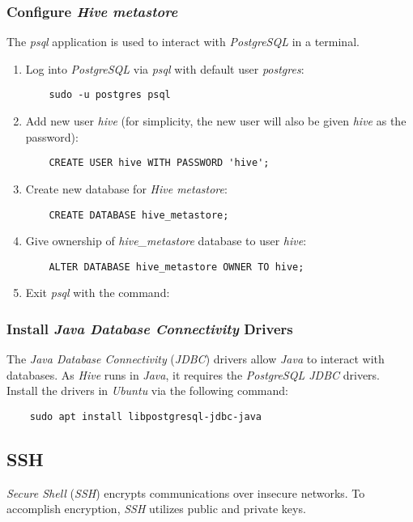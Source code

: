 \documentclass{article}
\begin{document}
    \subsubsection{Configure \emph{Hive metastore}}
    The \emph{psql} application is used to interact with \emph{PostgreSQL} in a terminal.
    \begin{enumerate}
    \item Log into \emph{PostgreSQL} via \emph{psql} with default user \emph{postgres}:
    \begin{verbatim}
    sudo -u postgres psql 
    \end{verbatim}

    \item Add new user \emph{hive}
    (for simplicity, the new user will also be given \emph{hive} as the password):
    \begin{verbatim}
    CREATE USER hive WITH PASSWORD 'hive';
    \end{verbatim}

    \item Create new database for \emph{Hive metastore}:
    \begin{verbatim}
    CREATE DATABASE hive_metastore;
    \end{verbatim}

    \item Give ownership of \emph{hive\_metastore} database to user \emph{hive}:
    \begin{verbatim}
    ALTER DATABASE hive_metastore OWNER TO hive;
    \end{verbatim}

    \item Exit \emph{psql} with the command: \texttt{\q}
    \end{enumerate}

    \subsubsection{Install \emph{Java Database Connectivity} Drivers}
    The \emph{Java Database Connectivity} (\emph{JDBC}) drivers allow \emph{Java} to interact with
    databases. As \emph{Hive} runs in \emph{Java}, it requires the \emph{PostgreSQL JDBC} drivers.
    Install the drivers in \emph{Ubuntu} via the following command:
    \begin{verbatim}
    sudo apt install libpostgresql-jdbc-java
    \end{verbatim}

  \subsection{SSH}
  \emph{Secure Shell} (\emph{SSH}) encrypts communications over insecure networks. To accomplish
  encryption, \emph{SSH} utilizes public and private keys.
\end{document}
